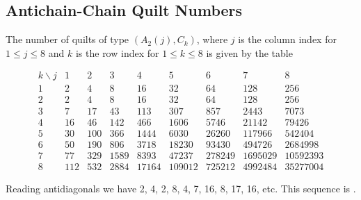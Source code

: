 \documentclass[12pt]{amsart}
\numberwithin{equation}{section}
\theoremstyle{definition}
\begin{document}
\subsection{Antichain-Chain Quilt Numbers}


The number of quilts of type $(A_2(j), C_k)$, where $j$ is the
column index for $1\leq j\leq 8$ and $k$ is the row index for $1\leq
k\leq 8$ is given by the table 
\begin{small}
$$\begin{array}{c|cccccccc}
   k \backslash j & 1 & 2 & 3 & 4 & 5 & 6 & 7 & 8\\ \hline
1 & 2 & 4 & 8 & 16 & 32 & 64 & 128 & 256 \\
2 & 2 & 4 & 8 & 16 & 32 & 64 & 128 & 256 \\
3 & 7 & 17 & 43 & 113 & 307 & 857 & 2443 & 7073 \\
4 & 16 & 46 & 142 & 466 & 1606 & 5746 & 21142 & 79426 \\
5 & 30 & 100 & 366 & 1444 & 6030 & 26260 & 117966 & 542404 \\
6 & 50 & 190 & 806 & 3718 & 18230 & 93430 & 494726 & 2684998 \\
7 & 77 & 329 & 1589 & 8393 & 47237 & 278249 & 1695029 & 10592393 \\
8 & 112 & 532 & 2884 & 17164 & 109012 & 725212 & 4992484 & 35277004
\end{array}$$
\end{small}
Reading antidiagonals we have 2, 4, 2, 8, 4, 7, 16, 8, 17, 16, etc.  This sequence is \cite[A374822]{oeis}.
\end{document}
